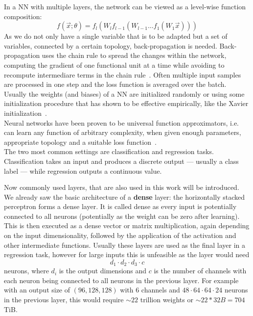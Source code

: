 In a NN with multiple layers, the network can be viewed as a level-wise function composition:
\[ f(\overrightarrow{x}; \theta) = f_l (W_l f_{l-1}(W_{l-1} \dots f_1(W_1 \overrightarrow{x}))) \]
As we do not only have a single variable that is to be adapted but a set of variables, connected by a certain topology, back-propagation is needed.
Back-propagation uses the chain rule to spread the changes within the network, computing the gradient of one functional unit at a time while avoiding to recompute intermediare terms in the chain rule~\autocite{van_der_malsburg_frank_1986}.
Often multiple input samples are processed in one step and the loss function is averaged over the batch.
Usually the weights (and biases) of a NN are initialized randomly or using some initialization procedure that has shown to be effective empirically, like the Xavier initialization~\autocite{glorot_understanding_2010}. \\

Neural networks have been proven to be universal function approximators, i.e. can learn any function of arbitrary complexity, when given enough parameters, appropriate topology and a suitable loss function~\autocite{sonoda_neural_2017}. \\
The two most common settings are classification and regression tasks.
Classification takes an input and produces a discrete output --- usually a class label --- while regression outputs a continuous value.

Now commonly used layers, that are also used in this work will be introduced.
We already saw the basic architecture of a \textbf{dense} layer: the horizontally stacked perceptron forms a dense layer.
It is called dense as every input is potentially connected to all neurons (potentially as the weight can be zero after learning).
This is then executed as a dense vector or matrix multiplication, again depending on the input dimensionality, followed by the application of the activation and other intermediate functions.
Usually these layers are used as the final layer in a regression task, however for large inputs this is unfeasible as the layer would need
\[ d_1 \cdot d_2 \cdot d_3  \cdot c \]
neurons, where $d_i$ is the output dimensions and $c$ is the number of channels with each neuron being connected to all neurons in the previous layer.
For example with an output size of $(96, 128, 128)$ with $6$ channels and $48 \cdot 64 \cdot 64 \cdot 24$ neurons in the previous layer, this would require $\sim22$ trillion weights or $\sim22 * 32B = 704$ TiB.

